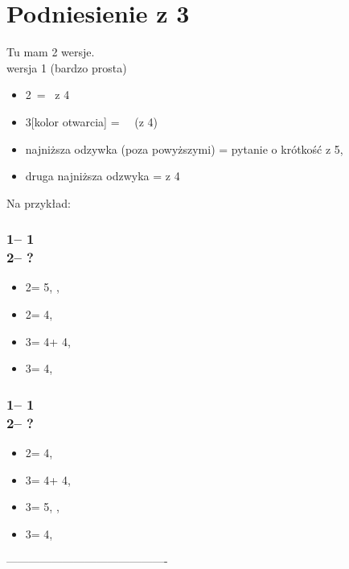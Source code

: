 \documentclass[12pt, a4paper]{report}
\begin{document}
\section*{\colorbox{blue!30}{Podniesienie z 3}}
 {
    Tu mam 2 wersje.\\
    {\large wersja 1 (bardzo prosta)}

    \begin{itemize}
        \item 2\nt\ = \inv\ z 4\major\ \nf
        \item 3[kolor otwarcia] = \nat\ \inv\ (z 4\major)
        \item najniższa odzywka (poza powyższymi) = pytanie o krótkość z 5\major, \gf
        \item druga najniższa odzwyka = \gf z 4\major
    \end{itemize}

    Na przykład:

    \subsubsection*{1\clubs -- 1\hearts \\ 2\hearts -- ?}
    \begin{itemize}
        \item 2\spades = 5\hearts, \gf, \lsf
        \item 2\nt = 4\hearts, \inv
        \item 3\clubs = 4\hearts + 4\clubs, \inv
        \item 3\diams = 4\hearts, \gf
    \end{itemize}

    \subsubsection*{1\clubs -- 1\spades \\ 2\spades -- ?}
    \begin{itemize}
        \item 2\nt = 4\spades, \inv
        \item 3\clubs = 4\spades + 4\clubs, \inv
        \item 3\diams = 5\spades, \gf, \lsf
        \item 3\hearts = 4\spades, \gf
    \end{itemize}

    -------------------------------------------\\

}
\end{document}
